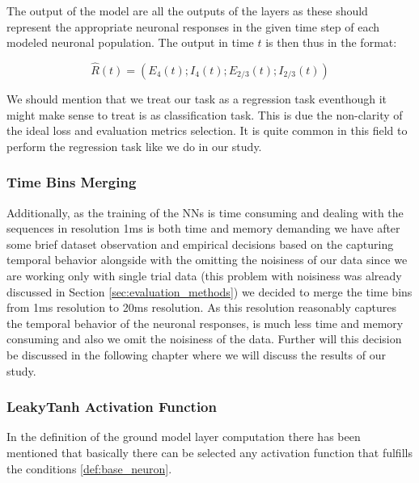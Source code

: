 The output of the model are all the outputs of the layers as these should represent the appropriate neuronal responses in the given time step of each modeled neuronal population. The output in time $t$ is then thus in the format:

$$\hat{R}(t) = (E_4(t); I_4(t); E_{2/3}(t); I_{2/3}(t)) $$

We should mention that we treat our task as a regression task eventhough it might make sense to treat is as classification task. This is due the non-clarity of the ideal loss and evaluation metrics selection. It is quite common in this field to perform the regression task like we do in our study.

\subsubsection{Time Bins Merging}
\label{subsubsec:time_bins_merging}

Additionally, as the training of the NNs is time consuming and dealing with the sequences in resolution 1ms is both time and memory demanding we have after some brief dataset observation and empirical decisions based on the capturing temporal behavior alongside with the omitting the noisiness of our data since we are working only with single trial data (this problem with noisiness was already discussed in Section \ref{sec:evaluation_methods}) we decided to merge the time bins from 1ms resolution to 20ms resolution. As this resolution reasonably captures the temporal behavior of the neuronal responses, is much less time and memory consuming and also we omit the noisiness of the data. Further will this decision be discussed in the following chapter where we will discuss the results of our study.

\subsubsection{LeakyTanh Activation Function}
\label{subsubsec:leakytanh}

In the definition of the ground model layer computation there has been mentioned that basically there can be selected any activation function that fulfills the conditions \ref{def:base_neuron}.

